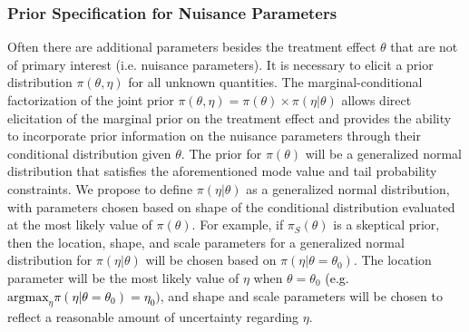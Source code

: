 \documentclass[12pt]{article}
\begin{document}
%

%



\subsubsection{Prior Specification for Nuisance Parameters}\label{sec:cond_marg}
Often there are additional parameters besides the treatment effect $\theta$ that are not of primary interest (i.e. nuisance parameters).
%
It is necessary to elicit a prior distribution $\pi(\theta,\eta)$ for all unknown quantities.
%
The marginal-conditional factorization of the joint prior $\pi(\theta,\eta)=\pi(\theta)\times\pi(\eta|\theta)$ allows direct elicitation of the marginal prior on the treatment effect and provides the ability to incorporate prior information on the nuisance parameters through their conditional distribution given $\theta$.
%
The prior for $\pi(\theta)$ will be a generalized normal distribution that satisfies the aforementioned mode value and tail probability constraints.
%
We propose to define $\pi(\eta|\theta)$ as a generalized normal distribution, with parameters chosen based on shape of the conditional distribution evaluated at the most likely value of $\pi(\theta)$. For example, if $\pi_S(\theta)$ is a skeptical prior, then the location, shape, and scale parameters for a generalized normal distribution for $\pi(\eta|\theta)$ will be chosen based on $\pi(\eta|\theta=\theta_0)$. The location parameter will be the most likely value of $\eta$ when $\theta=\theta_0$ \textcolor{black}{(e.g. $\text{argmax}_\eta \pi(\eta|\theta=\theta_0)=\eta_0)$}, and shape and scale parameters will be chosen to reflect a reasonable amount of uncertainty regarding $\eta$. 
%
\end{document}

